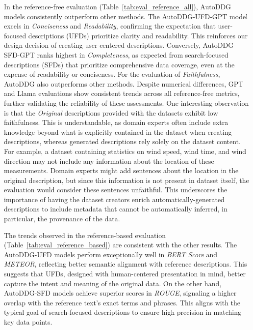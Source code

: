 % 
In the reference-free evaluation (Table~\ref{tab:eval_reference_all}), AutoDDG models consistently outperform other methods. The AutoDDG-UFD-GPT model excels in \textit{Conciseness} and \textit{Readability}, confirming the expectation that user-focused descriptions (UFDs) prioritize clarity and readability. This reinforces our design decision of creating user-centered descriptions. 
Conversely, AutoDDG-SFD-GPT ranks highest in \textit{Completeness}, as expected from search-focused descriptions (SFDs) that prioritize comprehensive data coverage, even at the expense of readability or conciseness.
% 
For the evaluation of \textit{Faithfulness}, AutoDDG also outperforms other methods. 
% 
Despite numerical differences, GPT and Llama evaluations show consistent trends across all reference-free metrics, further validating the reliability of these assessments.
% 
One interesting observation is that the \textit{Original} descriptions provided with the datasets exhibit low faithfulness.
%
This is understandable, as domain experts often include extra knowledge beyond what is explicitly contained in the dataset when creating descriptions, whereas generated descriptions rely solely on the dataset content.
%
For example, a dataset containing statistics on wind speed, wind time, and wind direction may not include any information about the location of these measurements. Domain experts might add sentences about the location in the original description, but since this information is not present in dataset itself, the evaluation would consider these sentences unfaithful.
%
This underscores the importance of having the dataset creators enrich automatically-generated descriptions to include metadata that cannot be automatically inferred, in particular, the provenance of the data.

% 
The trends observed in the reference-based evaluation (Table~\ref{tab:eval_reference_based}) are consistent with the other results.  The AutoDDG-UFD models perform exceptionally well in \textit{BERT Score} and \textit{METEOR}, reflecting better semantic alignment with reference descriptions. This suggests that UFDs, designed with human-centered presentation in mind, better capture the intent and meaning of the original data. On the other hand, AutoDDG-SFD models achieve superior scores in \textit{ROUGE}, signaling a higher overlap with the reference text's exact terms and phrases. This aligns with the typical goal of search-focused descriptions to ensure high precision in matching key data points.

